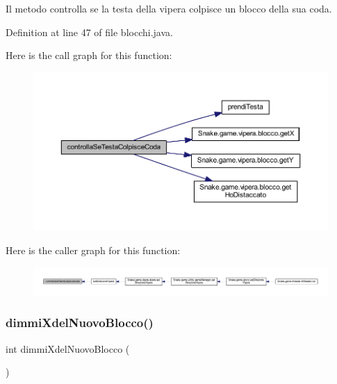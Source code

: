 Il metodo controlla se la testa della vipera colpisce un blocco della sua coda. 



Definition at line 47 of file blocchi.\+java.

Here is the call graph for this function\+:
\nopagebreak
\begin{figure}[H]
\begin{center}
\leavevmode
\includegraphics[width=350pt]{class_snake_1_1game_1_1vipera_1_1blocchi_a1437df7b6446c67e0385922e99343857_cgraph}
\end{center}
\end{figure}
Here is the caller graph for this function\+:
\nopagebreak
\begin{figure}[H]
\begin{center}
\leavevmode
\includegraphics[width=350pt]{class_snake_1_1game_1_1vipera_1_1blocchi_a1437df7b6446c67e0385922e99343857_icgraph}
\end{center}
\end{figure}
\mbox{\label{class_snake_1_1game_1_1vipera_1_1blocchi_afda852123016bddf1840fdb19241ffa3}} 
\subsubsection{\texorpdfstring{dimmi\+Xdel\+Nuovo\+Blocco()}{dimmiXdelNuovoBlocco()}}
{\footnotesize\ttfamily int dimmi\+Xdel\+Nuovo\+Blocco (\begin{DoxyParamCaption}{ }\end{DoxyParamCaption})\hspace{0.3cm}{\ttfamily [private]}}



